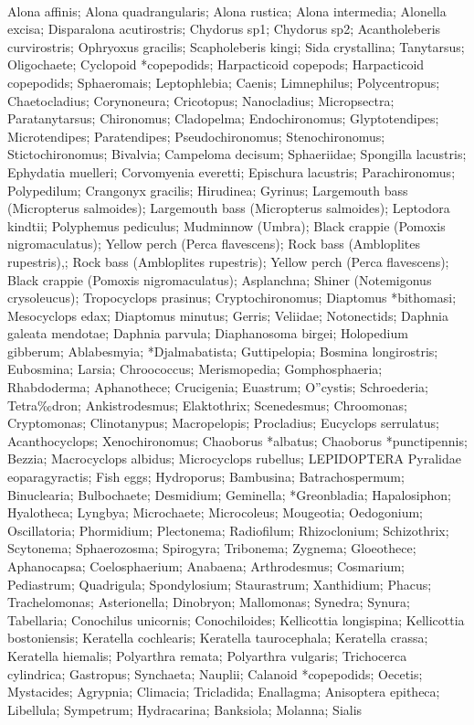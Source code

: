 \fullhline
\hline
{} \\
\hline
Alona affinis; Alona quadrangularis; Alona rustica; Alona intermedia; Alonella excisa; Disparalona acutirostris; Chydorus sp1; Chydorus sp2; Acantholeberis curvirostris; Ophryoxus gracilis; Scapholeberis kingi; Sida crystallina; Tanytarsus; Oligochaete; Cyclopoid *copepodids; Harpacticoid copepods; Harpacticoid copepodids; Sphaeromais; Leptophlebia; Caenis; Limnephilus; Polycentropus; Chaetocladius; Corynoneura; Cricotopus; Nanocladius; Micropsectra; Paratanytarsus; Chironomus; Cladopelma; Endochironomus; Glyptotendipes; Microtendipes; Paratendipes; Pseudochironomus; Stenochironomus; Stictochironomus; Bivalvia; Campeloma decisum; Sphaeriidae; Spongilla lacustris; Ephydatia muelleri; Corvomyenia everetti; Epischura lacustris; Parachironomus; Polypedilum; Crangonyx gracilis; Hirudinea; Gyrinus; Largemouth bass (Micropterus salmoides); Largemouth bass (Micropterus salmoides); Leptodora kindtii; Polyphemus pediculus; Mudminnow (Umbra); Black crappie (Pomoxis nigromaculatus); Yellow perch (Perca flavescens); Rock bass (Ambloplites rupestris),; Rock bass (Ambloplites rupestris); Yellow perch (Perca flavescens); Black crappie (Pomoxis nigromaculatus); Asplanchna; Shiner (Notemigonus crysoleucus); Tropocyclops prasinus; Cryptochironomus; Diaptomus *bithomasi; Mesocyclops edax; Diaptomus minutus; Gerris; Veliidae; Notonectids; Daphnia galeata mendotae; Daphnia parvula; Diaphanosoma birgei; Holopedium gibberum; Ablabesmyia; *Djalmabatista; Guttipelopia; Bosmina longirostris; Eubosmina; Larsia; Chroococcus; Merismopedia; Gomphosphaeria; Rhabdoderma; Aphanothece; Crucigenia; Euastrum; O”cystis; Schroederia; Tetra‰dron; Ankistrodesmus; Elaktothrix; Scenedesmus; Chroomonas; Cryptomonas; Clinotanypus; Macropelopis; Procladius; Eucyclops serrulatus; Acanthocyclops; Xenochironomus; Chaoborus *albatus; Chaoborus *punctipennis; Bezzia; Macrocyclops albidus; Microcyclops rubellus; LEPIDOPTERA Pyralidae eoparagyractis; Fish eggs; Hydroporus; Bambusina; Batrachospermum; Binuclearia; Bulbochaete; Desmidium; Geminella; *Greonbladia; Hapalosiphon; Hyalotheca; Lyngbya; Microchaete; Microcoleus; Mougeotia; Oedogonium; Oscillatoria; Phormidium; Plectonema; Radiofilum; Rhizoclonium; Schizothrix; Scytonema; Sphaerozosma; Spirogyra; Tribonema; Zygnema; Gloeothece; Aphanocapsa; Coelosphaerium; Anabaena; Arthrodesmus; Cosmarium; Pediastrum; Quadrigula; Spondylosium; Staurastrum; Xanthidium; Phacus; Trachelomonas; Asterionella; Dinobryon; Mallomonas; Synedra; Synura; Tabellaria; Conochilus unicornis; Conochiloides; Kellicottia longispina; Kellicottia bostoniensis; Keratella cochlearis; Keratella taurocephala; Keratella crassa; Keratella hiemalis; Polyarthra remata; Polyarthra vulgaris; Trichocerca cylindrica; Gastropus; Synchaeta; Nauplii; Calanoid *copepodids; Oecetis; Mystacides; Agrypnia; Climacia; Tricladida; Enallagma; Anisoptera epitheca; Libellula; Sympetrum; Hydracarina; Banksiola; Molanna; Sialis\\
